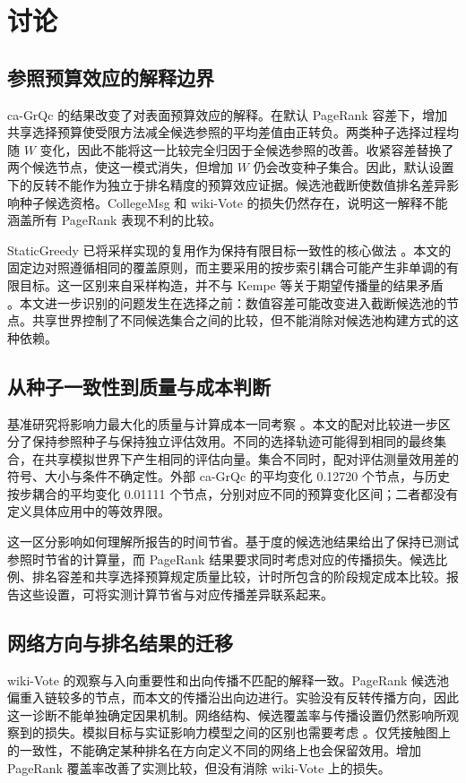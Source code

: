 \documentclass[smallextended]{svjour3}
\begin{document}
\section{讨论}
\subsection{参照预算效应的解释边界}
ca-GrQc 的结果改变了对表面预算效应的解释。在默认 PageRank 容差下，增加共享选择预算使受限方法减全候选参照的平均差值由正转负。两类种子选择过程均随 $W$ 变化，因此不能将这一比较完全归因于全候选参照的改善。收紧容差替换了两个候选节点，使这一模式消失，但增加 $W$ 仍会改变种子集合。因此，默认设置下的反转不能作为独立于排名精度的预算效应证据。候选池截断使数值排名差异影响种子候选资格。CollegeMsg 和 wiki-Vote 的损失仍然存在，说明这一解释不能涵盖所有 PageRank 表现不利的比较。

StaticGreedy 已将采样实现的复用作为保持有限目标一致性的核心做法 \cite{ref8}。本文的固定边对照遵循相同的覆盖原则，而主要采用的按步索引耦合可能产生非单调的有限目标。这一区别来自采样构造，并不与 Kempe 等关于期望传播量的结果矛盾 \cite{ref1}。本文进一步识别的问题发生在选择之前：数值容差可能改变进入截断候选池的节点。共享世界控制了不同候选集合之间的比较，但不能消除对候选池构建方式的这种依赖。

\subsection{从种子一致性到质量与成本判断}
基准研究将影响力最大化的质量与计算成本一同考察 \cite{ref16}。本文的配对比较进一步区分了保持参照种子与保持独立评估效用。不同的选择轨迹可能得到相同的最终集合，在共享模拟世界下产生相同的评估向量。集合不同时，配对评估测量效用差的符号、大小与条件不确定性。外部 ca-GrQc 的平均变化 0.12720 个节点，与历史按步耦合的平均变化 0.01111 个节点，分别对应不同的预算变化区间；二者都没有定义具体应用中的等效界限。

这一区分影响如何理解所报告的时间节省。基于度的候选池结果给出了保持已测试参照时节省的计算量，而 PageRank 结果要求同时考虑对应的传播损失。候选比例、排名容差和共享选择预算规定质量比较，计时所包含的阶段规定成本比较。报告这些设置，可将实测计算节省与对应传播差异联系起来。

\subsection{网络方向与排名结果的迁移}
wiki-Vote 的观察与入向重要性和出向传播不匹配的解释一致。PageRank 候选池偏重入链较多的节点，而本文的传播沿出向边进行。实验没有反转传播方向，因此这一诊断不能单独确定因果机制。网络结构、候选覆盖率与传播设置仍然影响所观察到的损失。模拟目标与实证影响力模型之间的区别也需要考虑 \cite{ref15}。仅凭接触图上的一致性，不能确定某种排名在方向定义不同的网络上也会保留效用。增加 PageRank 覆盖率改善了实测比较，但没有消除 wiki-Vote 上的损失。
\end{document}
